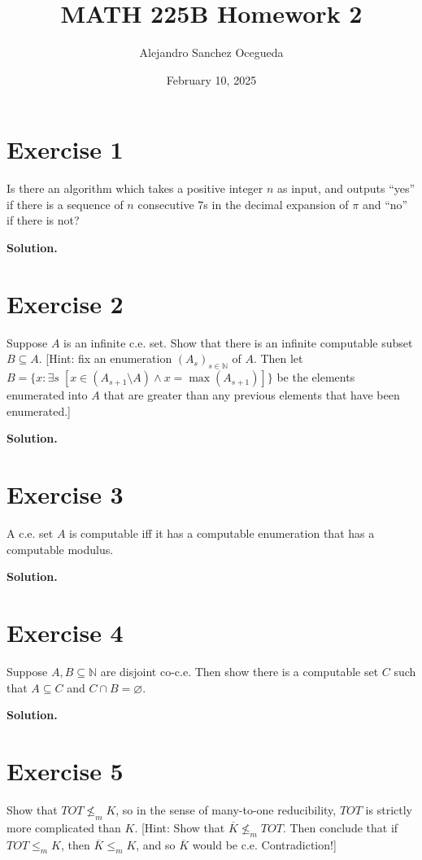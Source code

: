 \documentclass{article}
\title{MATH 225B Homework 2}
\author{Alejandro Sanchez Ocegueda}
\date{February 10, 2025}
\newcommand{\nat}{\mathbb{N}}
\newcommand{\solution}{\noindent \textbf{Solution.}}
\begin{document}
\maketitle

\section*{Exercise 1}
Is there an algorithm which takes a positive integer $n$ as input, and outputs ``yes'' if there is a sequence of $n$ consecutive 7s in the decimal expansion of $\pi$ and ``no'' if there is not?


\vspace{3mm}
\solution


\newpage
\section*{Exercise 2}
Suppose $A$ is an infinite c.e. set. Show that there is an infinite computable subset $B \subseteq A$.
[Hint: fix an enumeration $(A_s)_{s \in \nat}$ of $A$.
Then let $B = \{x : \exists s\;[x \in (A_{s + 1} \setminus A) \land x = \max (A_{s+1})]\}$ be the elements enumerated into $A$ that are greater than any previous elements that have been enumerated.]


\vspace{3mm}
\solution


\newpage
\section*{Exercise 3}
A c.e. set $A$ is computable iff it has a computable enumeration that has a computable modulus.

\vspace{3mm}
\solution



\newpage
\section*{Exercise 4}
Suppose $A, B \subseteq \nat$ are disjoint co-c.e.
Then show there is a computable set $C$ such that $A \subseteq C$ and $C \cap B = \varnothing$.


\vspace{3mm}
\solution

\newpage
\section*{Exercise 5}
Show that $TOT \nleq_m K$, 
so in the sense of many-to-one reducibility,
$TOT$ is strictly more complicated than $K$.
[Hint: Show that $\overline{K} \nleq_m TOT$.
Then conclude that if $TOT \leq_m K$, then $\overline{K} \leq_m K$, and so $\overline{K}$ would be c.e. Contradiction!]
\end{document}
